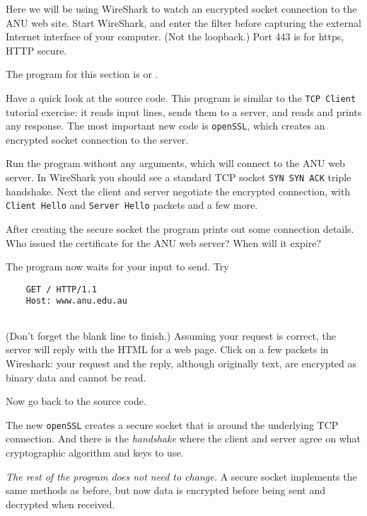 Here we will be using WireShark to watch an encrypted socket connection
to the ANU web site. Start WireShark, and enter the filter
before capturing the external Internet interface of your computer. (Not the
loopback.) Port 443 is for https, HTTP secure.

\STEP The program for this section is  or .

Have a quick look at the source code. This program is similar to the
\texttt{TCP Client}
tutorial exercise: it reads input lines, sends them to a server, and reads and
prints any response. The most important new code is \texttt{openSSL}, which
creates an encrypted socket connection to the server.

Run the program without any arguments, which will connect to the ANU web server.
In WireShark you should see a standard TCP socket
\texttt{SYN SYN ACK} triple handshake.
Next the client and server negotiate the encrypted connection, with
\texttt{Client Hello} and \texttt{Server Hello} packets and a few more.

After creating the secure socket the program prints out some connection details.
Who issued the certificate for the ANU web server? When will it expire?

The program now waits for your input to send. Try
\begin{CODE}\begin{verbatim}
    GET / HTTP/1.1
    Host: www.anu.edu.au
    
\end{verbatim}\end{CODE}

(Don't forget the blank line to finish.)
Assuming your request is correct, the server will reply with the HTML for a web
page. Click on a few packets in Wireshark: your request and the reply, although
originally text, are encrypted as binary data and cannot be read.

Now go back to the source code.

The new \texttt{openSSL} creates a secure socket that is  around the
underlying TCP connection. And there is the \emph{handshake} where the client and
server agree on what cryptographic algorithm and keys to use.

\emph{The rest of the program does not need to change.} A secure socket implements
the same methods as before, but now data is encrypted before being sent and
decrypted when received.

